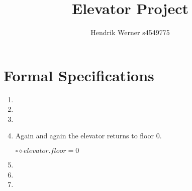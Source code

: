 \documentclass[12pt, a4paper]{article}
\title{Elevator Project}
\author{Hendrik Werner s4549775}
\begin{document}
\maketitle

\section{Formal Specifications}
\begin{enumerate}
	\item %
	\item %
	\item %
	\item %
	Again and again the elevator returns to floor 0.

	$\square \diamond elevator.floor = 0$
	\item %
	\item %
	\item %
\end{enumerate}
\end{document}

